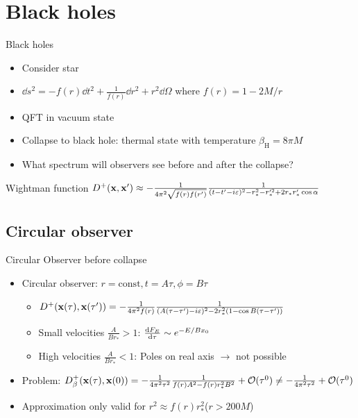 \documentclass{beamer}
\newcommand{\ind}[1]{_\mathrm{#1}}
\begin{document}
\section{Black holes}
\begin{frame}{Black holes}
\begin{itemize}
	\item Consider star
	\item \(\dd s^2 = -f(r)\dd{t^2} + \frac{1}{f(r)}\dd{r^2} + r^2 \dd{\Omega}\) where \(f(r) = 1 - 2M/r\)
	\item QFT in vacuum state
	\item Collapse to black hole: thermal state with temperature \(\beta\ind{H} = 8\pi M\)
	\item What spectrum will observers see before and after the collapse?
\end{itemize}
\begin{block}{Wightman function}
	\(D^+(\vb{x}, \vb{x}') \approx -\frac{1}{4\pi^2 \sqrt{f(r)f(r')}} \frac{1}{(t-t'-i\varepsilon)^2 - r_*^2 - r_*'^2 + 2r_*r_*' \cos{\alpha}}\)
\end{block}
\end{frame}


\subsection{Circular observer}

\begin{frame}{Circular Observer before collapse}
\begin{itemize}
	\item Circular observer: \(r = \mathrm{const}, t = A\tau, \phi = B \tau\)
	\begin{itemize}
		\item \(D^+(\vb{x}(\tau), \vb{x}(\tau')) = -\frac{1}{4\pi^2f(r)} \frac{1}{(A(\tau-\tau')-i\varepsilon)^2 - 2r_*^2 (1 - \cos{B(\tau-\tau')})}\)
		\item Small velocities \(\frac{A}{Br_*} > 1\): \(\dv{F_E}{\tau} \sim e^{-E/B x_0}\)
		\item High velocities \(\frac{A}{Br_*} < 1\): Poles on real axis \(\to\) not possible
	\end{itemize}
	\item Problem: \(D^+_\beta(\vb{x}(\tau),\vb{x}(0)) = -\frac{1}{4\pi^2 \tau^2} \frac{1}{f(r) A^2 - f(r)r_*^2 B^2} + \order*{\tau^0}\neq -\frac{1}{4\pi^2 \tau^2} + \order*{\tau^0}\)
	\item Approximation only valid for \(r^2 \approx f(r)r_*^2\)\hspace{1cm}(\(r > 200 M\))
\end{itemize}
\end{frame}
\end{document}
